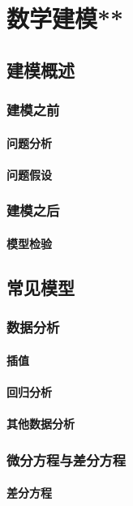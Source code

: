 \part{数学建模**}
\chapter{建模概述}
\section{建模之前}
\subsection{问题分析}
\clearpage
\subsection{问题假设}
\clearpage
\section{建模之后}
\subsection{模型检验}
\clearpage
\chapter{常见模型}
\section{数据分析}
\subsection{插值}
\clearpage
\subsection{回归分析}
\clearpage
\subsection{其他数据分析}
\clearpage
\section{微分方程与差分方程}
\subsection{差分方程}
\clearpage
